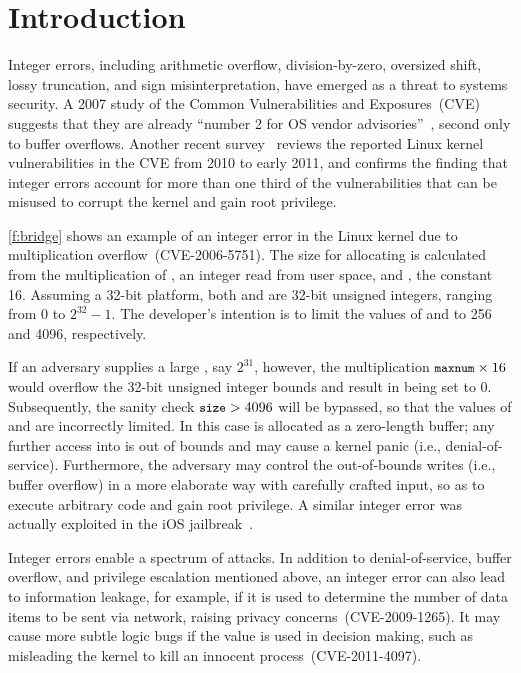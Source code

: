\section{Introduction}
\label{s:intro}

Integer errors, including arithmetic overflow, division-by-zero,
oversized shift, lossy truncation, and sign misinterpretation, have
emerged as a threat to systems security.  A 2007 study of the
Common Vulnerabilities and Exposures~(CVE)~\cite{cve} suggests that
they are already ``number 2 for OS vendor
advisories''~\cite{christey:vuln}, second only to buffer overflows.
Another recent survey~\cite{chen:kbugs} reviews the reported Linux kernel
vulnerabilities in the CVE from 2010 to early 2011, and confirms
the finding that integer errors account for more than one third of
the vulnerabilities that can be misused to corrupt the kernel and
gain root privilege.

\autoref{f:bridge} shows an example of an integer error in the Linux
kernel due to multiplication overflow~(CVE-2006-5751).  The size
for allocating  is calculated from the multiplication of
, an integer read from user space,
and , the constant 16.  Assuming
a 32-bit platform, both  and  are 32-bit unsigned
integers, ranging from 0 to $2^{32} - 1$.  The developer's intention
is to limit the values of  and  to 256 and 4096,
respectively.

If an adversary supplies a large , say $2^{31}$,
however, the multiplication $\cc{maxnum} \times 16$ would
overflow the 32-bit unsigned integer bounds and result in 
being set to 0.  Subsequently, the sanity check $\cc{size} > 4096$
will be bypassed, so that the values of  and 
are incorrectly limited.  In this case  is allocated as
a zero-length buffer; any further access into  is out of
bounds and may cause a kernel panic (i.e., denial-of-service).
Furthermore, the adversary may control the out-of-bounds writes
(i.e., buffer overflow) in a more elaborate way with carefully
crafted input, so as to execute arbitrary code and gain root
privilege.  A similar integer error was actually exploited
in the iOS jailbreak~\cite{esser:ios}.

Integer errors enable a spectrum of attacks.  In addition to
denial-of-service, buffer overflow, and privilege escalation
mentioned above, an integer error can also lead to information
leakage, for example, if it is used to determine the number of data
items to be sent via network, raising privacy concerns~(CVE-2009-1265).
It may cause more subtle logic bugs if the value is used in decision
making, such as misleading the kernel to kill an innocent
process~(CVE-2011-4097).

